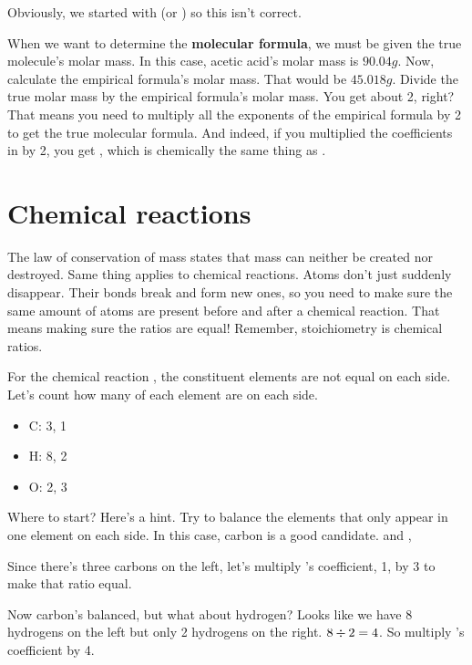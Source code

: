 \documentclass[letterpaper, 12pt]{article}
\begin{document}
Obviously, we started with  (or ) so this isn't correct.

When we want to determine the \textbf{molecular formula}, we must be given the true molecule's molar mass. In this case, acetic acid's molar mass is $90.04 g$. Now, calculate the empirical formula's molar mass. That would be $45.018 g$. Divide the true molar mass by the empirical formula's molar mass. You get about 2, right? That means you need to multiply all the exponents of the empirical formula by 2 to get the true molecular formula. And indeed, if you multiplied the coefficients in  by 2, you get , which is chemically the same thing as .

\section{Chemical reactions}
The law of conservation of mass states that mass can neither be created nor destroyed. Same thing applies to chemical reactions. Atoms don't just suddenly disappear. Their bonds break and form new ones, so you need to make sure the same amount of atoms are present before and after a chemical reaction. That means making sure the ratios are equal! Remember, stoichiometry is chemical ratios.

For the chemical reaction , the constituent elements are not equal on each side. Let's count how many of each element are on each side.

\begin{itemize}
	\item C: 3, 1
	\item H: 8, 2
	\item O: 2, 3
\end{itemize}

Where to start? Here's a hint. Try to balance the elements that only appear in one element on each side. In this case, carbon is a good candidate.   and  , 

Since there's three carbons on the left, let's multiply 's coefficient, 1, by 3 to make that ratio equal.


Now carbon's balanced, but what about hydrogen? Looks like we have 8 hydrogens on the left but only 2 hydrogens on the right. $8 \divisionsymbol 2 = 4$. So multiply 's coefficient by 4.
\end{document}
